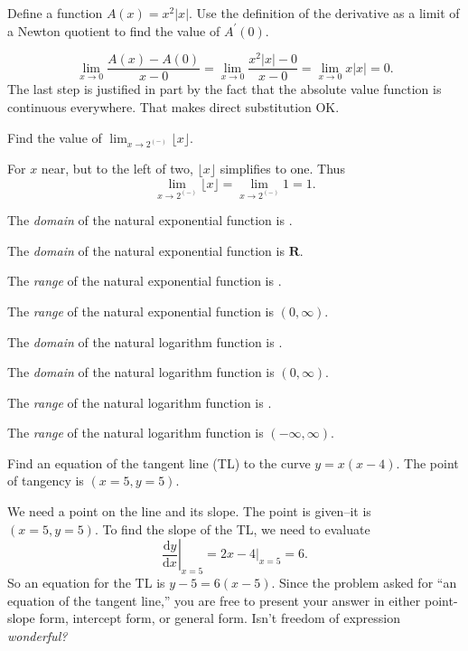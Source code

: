 \documentclass[12pt, answers,fleqn]{exam}
\newcommand{\reals}{\mathbf{R}}
\begin{document}
\begin{questions}
\question Define a function $A(x) = x^2 |x|$. Use the definition of
the derivative as a limit of a Newton quotient to find the value of $A^\prime(0)$.
\begin{solution}   
    \[
        \lim_{x \to 0} \frac{A(x) - A(0)}{x-0} =
    \lim_{x \to 0} \frac{x^2 |x| - 0}{x-0} = \lim_{x \to 0} x |x| = 0.
    \]
The last step is justified in part by the fact that the absolute value
function is continuous everywhere. That makes direct substitution OK.
\end{solution}
\question Find the value of \(\displaystyle \lim_{x \to 2^{(-)}} 
 \lfloor x \rfloor \).
\begin{solution}
For $x$ near, but to the left of two, \(\lfloor x \rfloor \) simplifies
to one. Thus
\[
    \lim_{x \to 2^{(-)}}  \lfloor x \rfloor = \lim_{x \to 2^{(-)}} 1 = 1.
\]
\end{solution}
\question The \emph{domain} of the natural exponential function is \underline{\phantom{xxxxxxxxx}}.
\begin{solution}
    The \emph{domain} of the natural exponential function is $\reals$.
\end{solution}
\question The \emph{range} of the natural exponential function is  \underline{\phantom{xxxxxxxxx}}.
\begin{solution}
    The \emph{range} of the natural exponential function is $(0,\infty)$.
\end{solution}
    
\question The \emph{domain} of the natural logarithm function is \underline{\phantom{xxxxxxxxx}}.
\begin{solution}
    The \emph{domain} of the natural logarithm function is  \((0,\infty)\).
\end{solution}
\question The \emph{range} of the natural logarithm function is    \underline{\phantom{xxxxxxxxx}}.
\begin{solution}
    The \emph{range} of the natural logarithm function is $(-\infty, \infty)$.
\end{solution}
\question Find an equation of the tangent line (TL) to the curve  $y = x (x-4)$. 
The point of tangency is $(x= 5, y=5)$.
\begin{solution}
    We need a point on the line and its slope.  The point is given--it is \mbox{$(x= 5, y=5)$}.
    To find the slope of the TL, we need to evaluate 
    \[
    \left. \frac{\mathrm{d}y}{\mathrm{d}x} \right \vert_{x=5} = 
    \left. 2x - 4\right \vert_{x=5}  = 6. 
    \]
    So an equation for the TL is $y-5 = 6(x-5).$  Since the problem
    asked for ``an equation of the tangent line,'' you are
    free to present your answer in either point-slope form,
    intercept form, or general form.  Isn't freedom of
    expression \emph{wonderful?}
    

\end{solution}
\end{questions}
\end{document}
